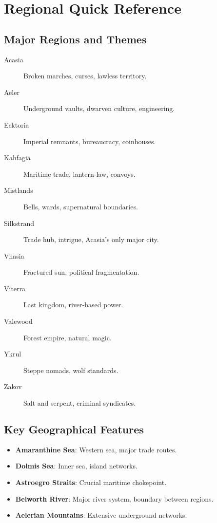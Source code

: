 \newpage
\section{Regional Quick Reference}\label{sec:regional_reference}

\subsection{Major Regions and Themes}\label{subsec:regions_themes}
\begin{description}
    \item[Acasia] Broken marches, curses, lawless territory.
    \item[Aeler] Underground vaults, dwarven culture, engineering.
    \item[Ecktoria] Imperial remnants, bureaucracy, coinhouses.
    \item[Kahfagia] Maritime trade, lantern‑law, convoys.
    \item[Mistlands] Bells, wards, supernatural boundaries.
    \item[Silkstrand] Trade hub, intrigue, Acasia's only major city.
    \item[Vhasia] Fractured sun, political fragmentation.
    \item[Viterra] Last kingdom, river‑based power.
    \item[Valewood] Forest empire, natural magic.
    \item[Ykrul] Steppe nomads, wolf standards.
    \item[Zakov] Salt and serpent, criminal syndicates.
\end{description}

\subsection{Key Geographical Features}\label{subsec:geography_ref}
\begin{itemize}
    \item \textbf{Amaranthine Sea}: Western sea, major trade routes.
    \item \textbf{Dolmis Sea}: Inner sea, island networks.
    \item \textbf{Astroegro Straits}: Crucial maritime chokepoint.
    \item \textbf{Belworth River}: Major river system, boundary between regions.
    \item \textbf{Aelerian Mountains}: Extensive underground networks.
\end{itemize}

